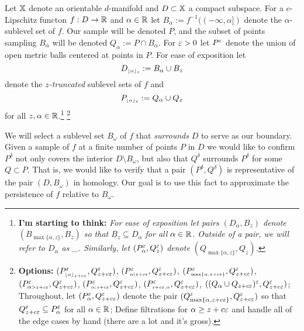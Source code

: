 
Let $\mathbb{X}$ denote an orientable $d$-manifold and $D\subset\mathbb{X}$ a compact subspace.
For a $c$-Lipschitz functon $f : D\to \mathbb{R}$ and $\alpha\in\mathbb{R}$ let $B_\alpha := f^{-1}((-\infty,\alpha])$ denote the $\alpha$-sublevel set of $f$.
Our sample will be denoted $P$, and the subset of points sampling $B_\alpha$ will be denoted $Q_\alpha := P\cap B_\alpha$.
For $\varepsilon > 0$ let $P^\varepsilon$ denote the union of open metric balls centered at points in $P$.
For ease of exposition let
\[ D_{\scriptscriptstyle \lfloor\alpha\rfloor_{z}} := B_\alpha\cup B_z \]
denote the \emph{$z$-truncated} sublevel sets of $f$ and %
\[ P_{\scriptscriptstyle \lfloor\alpha\rfloor_{z}} := Q_\alpha\cup Q_z\]
for all $z,\alpha\in\mathbb{R}$.\footnote{\textbf{I'm starting to think:} \emph{For ease of exposition let pairs $(D_\alpha, B_z)$ denote $(B_{\scriptscriptstyle\max\{\alpha,z\}},B_z)$ so that $B_z\subseteq D_\alpha$ for all $\alpha\in\mathbb{R}$. Outside of a pair, we will refer to $D_\alpha$ as \_. Similarly, let $(P_\alpha^\varepsilon, Q_z^\varepsilon)$ denote $(Q_{\scriptscriptstyle\max\{\alpha,z\}}, Q_z)$.}}
\footnote{\textbf{Options:}
  $(P_{\scriptscriptstyle \lfloor\alpha\rfloor_{z+c\varepsilon}}^\varepsilon, Q_{z+c\varepsilon}^\varepsilon)$,
  $(P_{\scriptscriptstyle\alpha\mid z+c\varepsilon}^\varepsilon, Q_{z+c\varepsilon}^\varepsilon)$,
  $(P_{\scriptscriptstyle\max\{\alpha, z+c\varepsilon\}}^\varepsilon, Q_{z+c\varepsilon}^\varepsilon)$,
  $(P_{\alpha {\scriptscriptstyle  > z+c\varepsilon}}^\varepsilon, Q_{z+c\varepsilon}^\varepsilon)$,
  $(P_{\scriptscriptstyle \alpha; z+c\varepsilon}^\varepsilon, Q_{z+c\varepsilon}^\varepsilon)$,
  $(P_{\scriptscriptstyle z+c\varepsilon, \alpha}^\varepsilon, Q_{z+c\varepsilon}^\varepsilon)$,
  $((Q_\alpha\cup Q_{z+c\varepsilon})^\varepsilon, Q_{z+c\varepsilon}^\varepsilon)$;
  Throughout, let $(P_\alpha^\varepsilon, Q_{z+c\varepsilon}^\varepsilon)$ denote the pair $(Q_{\max\{\alpha, z+c\varepsilon\}}^\varepsilon, Q_{z+c\varepsilon}^\varepsilon)$ so that $Q_{z+c\varepsilon}^\varepsilon \subseteq P_\alpha^\varepsilon$ for all $\alpha\in\mathbb{R}$;
  Define filtrations for $\alpha\geq z+c\varepsilon$ and handle all of the edge cases by hand (there are a lot and it's gross).
}

We will select a sublevel set $B_\omega$ of $f$ that \emph{surrounds} $D$ to serve as our boundary.
Given a sample of $f$ at a finite number of points $P$ in $D$ we would like to confirm $P^\delta$ not only covers the interior $D\setminus B_\omega$, but also that $Q^\delta$ surrounds $P^\delta$ for some $Q\subset P$.
That is, we would like to verify that a pair $(P^\delta, Q^\delta)$ is representative of the pair $(D,B_\omega)$ in homology.
Our goal is to use this fact to approximate the persistence of $f$ relative to $B_\omega$.

